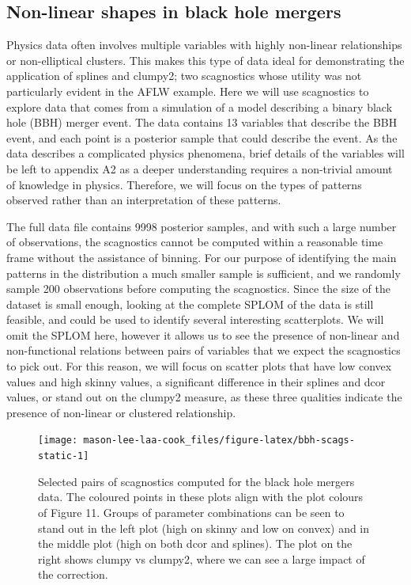 \subsection{Non-linear shapes in black hole mergers}\label{non-linear-shapes-in-black-hole-mergers}

Physics data often involves multiple variables with highly non-linear relationships or non-elliptical clusters. This makes this type of data ideal for demonstrating the application of splines and clumpy2; two scagnostics whose utility was not particularly evident in the AFLW example. Here we will use scagnostics to explore data that comes from a simulation of a model describing a binary black hole (BBH) merger event. The data contains 13 variables that describe the BBH event, and each point is a posterior sample that could describe the event. As the data describes a complicated physics phenomena, brief details of the variables will be left to appendix A2 as a deeper understanding requires a non-trivial amount of knowledge in physics. Therefore, we will focus on the types of patterns observed rather than an interpretation of these patterns.

The full data file contains 9998 posterior samples, and with such a large number of observations, the scagnostics cannot be computed within a reasonable time frame without the assistance of binning. For our purpose of identifying the main patterns in the distribution a much smaller sample is sufficient, and we randomly sample 200 observations before computing the scagnostics. Since the size of the dataset is small enough, looking at the complete SPLOM of the data is still feasible, and could be used to identify several interesting scatterplots. We will omit the SPLOM here, however it allows us to see the presence of non-linear and non-functional relations between pairs of variables that we expect the scagnostics to pick out. For this reason, we will focus on scatter plots that have low convex values and high skinny values, a significant difference in their splines and dcor values, or stand out on the clumpy2 measure, as these three qualities indicate the presence of non-linear or clustered relationship.

\begin{figure}
\texttt{[image: mason-lee-laa-cook\_files/figure-latex/bbh-scags-static-1]} \caption{Selected pairs of scagnostics computed for the black hole mergers data. The coloured points in these plots align with the plot colours of Figure 11. Groups of parameter combinations can be seen to stand out in the left plot (high on skinny and low on convex) and in the middle plot (high on both dcor and splines). The plot on the right shows clumpy vs clumpy2, where we can see a large impact of the correction. }\label{fig:bbh-scags-static}
\end{figure}

